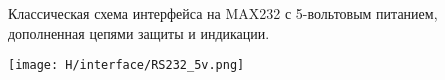  \secdown

Классическая схема интерфейса на MAX232 с 5-вольтовым питанием, дополненная
цепями защиты и индикации.

\clearpage
\texttt{[image: H/interface/RS232\_5v.png]}

\secup

